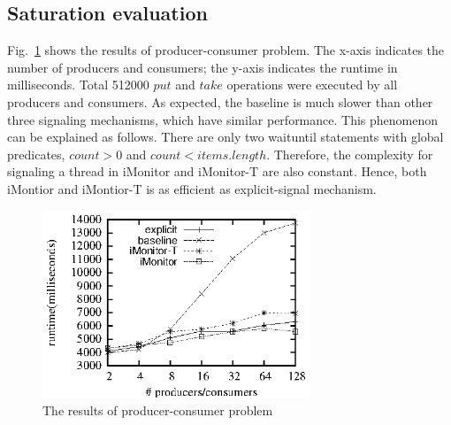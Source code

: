 \documentclass[preprint]{sigplanconf}
\begin{document}
%
\subsection{Saturation evaluation}


Fig.~\ref{fig:pc_eval} shows the results of producer-consumer problem. The 
x-axis indicates the number of producers and consumers; the y-axis indicates 
the runtime in milliseconds. Total 
512000 $put$ and $take$ operations were executed by
all producers and consumers. As expected, the baseline is much slower than
other three signaling mechanisms, which have similar performance. This 
phenomenon can be explained as follows. There are only two waituntil statements 
with global predicates, $count > 0$ and $count < items.length$. Therefore, the 
complexity for signaling a thread in iMonitor and iMonitor-T are also constant. 
Hence, both iMontior and iMontior-T is as efficient as explicit-signal 
mechanism. 

\begin{figure}[ht!]
  \centering
  \includegraphics[width=80mm]{fig/pc.eps}
  \caption{The results of producer-consumer problem}
  \label{fig:pc_eval}
\end{figure}
\end{document}
